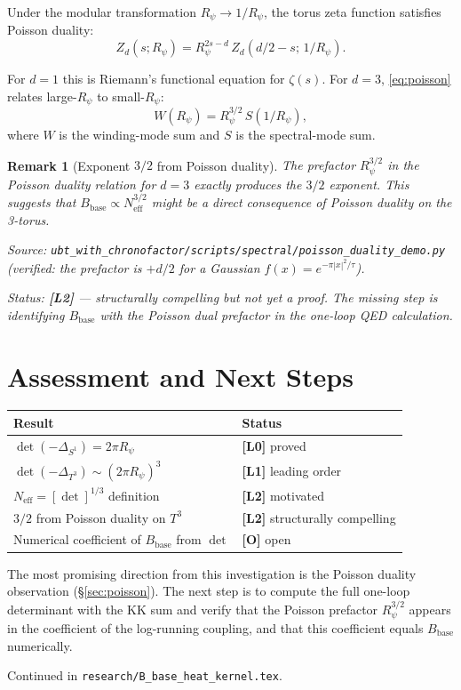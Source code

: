 \documentclass[11pt,a4paper]{article}
\newtheorem{remark}{Remark}
\begin{document}
Under the modular transformation $R_\psi \to 1/R_\psi$, the torus zeta
function satisfies Poisson duality:
\begin{equation}
\label{eq:poisson}
  Z_d(s; R_\psi) = R_\psi^{2s - d}\, Z_d(d/2 - s;\, 1/R_\psi).
\end{equation}

For $d = 1$ this is Riemann's functional equation for $\zeta(s)$.
For $d = 3$, \eqref{eq:poisson} relates large-$R_\psi$ to small-$R_\psi$:
\begin{equation}
  W(R_\psi) = R_\psi^{3/2}\, S(1/R_\psi),
\end{equation}
where $W$ is the winding-mode sum and $S$ is the spectral-mode sum.

\begin{remark}[Exponent $3/2$ from Poisson duality]
  The prefactor $R_\psi^{3/2}$ in the Poisson duality relation for $d=3$
  exactly produces the $3/2$ exponent.  This suggests that
  $B_{\mathrm{base}} \propto N_{\mathrm{eff}}^{3/2}$ might be a direct
  consequence of Poisson duality on the 3-torus.

  Source: \texttt{ubt\_with\_chronofactor/scripts/spectral/poisson\_duality\_demo.py}
  (verified: the prefactor is $+d/2$ for a Gaussian $f(x) = e^{-\pi|x|^2/\tau}$).

  Status: \textbf{[L2]} — structurally compelling but not yet a proof.
  The missing step is identifying $B_{\mathrm{base}}$ with the Poisson dual
  prefactor in the one-loop QED calculation.
\end{remark}

\section{Assessment and Next Steps}
\label{sec:assess}

\begin{center}
\begin{tabular}{ll}
\hline
Result & Status \\
\hline
$\det(-\Delta_{S^1}) = 2\pi R_\psi$ & \textbf{[L0]} proved \\
$\det(-\Delta_{T^3}) \sim (2\pi R_\psi)^3$ & \textbf{[L1]} leading order \\
$N_{\mathrm{eff}} = [\det]^{1/3}$ definition & \textbf{[L2]} motivated \\
$3/2$ from Poisson duality on $T^3$ & \textbf{[L2]} structurally compelling \\
Numerical coefficient of $B_{\mathrm{base}}$ from $\det$ & \textbf{[O]} open \\
\hline
\end{tabular}
\end{center}

The most promising direction from this investigation is the Poisson duality
observation (§\ref{sec:poisson}).  The next step is to compute the full
one-loop determinant with the KK sum and verify that the Poisson prefactor
$R_\psi^{3/2}$ appears in the coefficient of the log-running coupling, and
that this coefficient equals $B_{\mathrm{base}}$ numerically.

Continued in \texttt{research/B\_base\_heat\_kernel.tex}.
\end{document}
